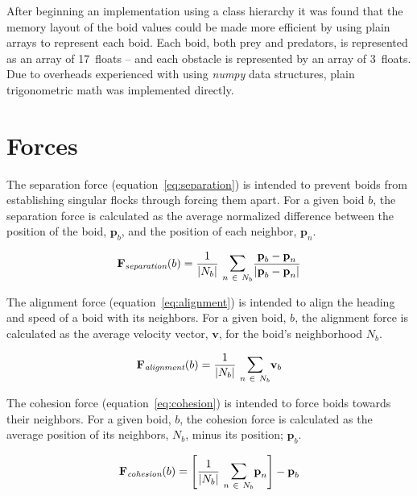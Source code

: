 After beginning an implementation using a class hierarchy it was found that the memory layout of the boid values could be made more efficient by using plain arrays to represent each boid. Each boid, both prey and predators, is represented as an array of 17~floats -- and each obstacle is represented by an array of 3~floats. Due to overheads experienced with using \textit{numpy} data structures, plain trigonometric math was implemented directly.

\section*{Forces}

The separation force (equation~\ref{eq:separation}) is intended to prevent boids from establishing singular flocks through forcing them apart. For a given boid $b$, the separation force is calculated as the average normalized difference between the position of the boid, $\textbf{p}_b$, and the position of each neighbor, $\textbf{p}_n$.

\begin{equation}
\label{eq:separation}
\textbf{F}_\textit{separation}(b) = \frac{1}{\left\vert N_b \right\vert}~\mathlarger{\sum}_{n~\in~N_b} \frac{\textbf{p}_b - \textbf{p}_n}{\left\vert\textbf{p}_b - \textbf{p}_n\right\vert}
\end{equation}

The alignment force (equation~\ref{eq:alignment}) is intended to align the heading and speed of a boid with its neighbors. For a given boid, $b$, the alignment force is calculated as the average velocity vector, $\textbf{v}$, for the boid's neighborhood $N_b$.

\begin{equation}
\label{eq:alignment}
\textbf{F}_\textit{alignment}(b) = \frac{1}{\left\vert N_b \right\vert}~\mathlarger{\sum}_{n~\in~N_b} \textbf{v}_b
\end{equation}

The cohesion force (equation~\ref{eq:cohesion}) is intended to force boids towards their neighbors. For a given boid, $b$, the cohesion force is calculated as the average position of its neighbors, $N_b$, minus its position; $\textbf{p}_b$.

\begin{equation}
\label{eq:cohesion}
\textbf{F}_\textit{cohesion}(b) = \Bigg[\frac{1}{\left\vert N_b \right\vert}~\mathlarger{\sum}_{n~\in~N_b} \textbf{p}_n\Bigg] - \textbf{p}_b
\end{equation}

